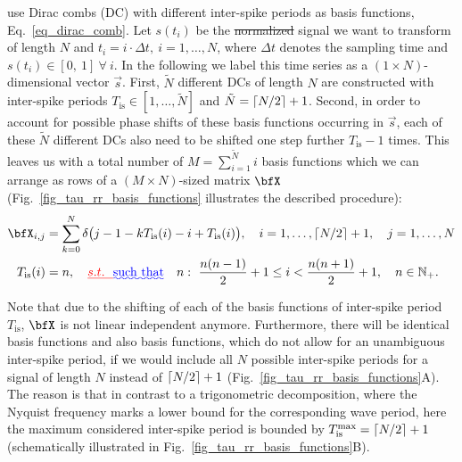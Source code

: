 \documentclass[entropy,article,submit,pdftex,moreauthors]{Definitions/mdpi}
\DeclarePairedDelimiter\ceil{\lceil}{\rceil}
\providecommand{\DIFadd}[1]{{\protect\color{blue}\uwave{#1}}} %
\providecommand{\DIFdel}[1]{{\protect\color{red}\sout{#1}}}                      %
\providecommand{\DIFaddbegin}{} %
\providecommand{\DIFaddend}{} %
\providecommand{\DIFdelbegin}{} %
\providecommand{\DIFdelend}{} %
\begin{document}
\DIFadd{Here we propose to }\DIFaddend use Dirac combs (DC) with 
different inter-spike periods as basis functions, Eq.~\eqref{eq_dirac_comb}. Let $s(t_i)$ be the \DIFdelbegin \DIFdel{normalized }\DIFdelend \DIFaddbegin \DIFadd{min-max-normalized }\DIFaddend signal we want to transform of length $N$ and 
$t_i=i\cdot \Delta t,~i=1,\ldots,N$, where $\Delta t$ denotes the sampling time and $s(t_i) \in [0,\ 1]\ \forall\ i$. In the following we label this time series as a $(1\times N)$-dimensional 
vector $\vec{s}$. 
First, $\tilde{N}$ different DCs of length $N$ are constructed with inter-spike periods $T_\text{is} \in [1,\ldots,\tilde{N}]$ and $\tilde{N}=\ceil*{N/2}+1$. Second, in order to account 
for possible phase shifts of 
these basis functions occurring in $\vec{s}$, each of these $\tilde{N}$ different DCs also need to be shifted one step further $T_\text{is}-1$ times. This leaves us with a total number of 
$M = \sum_{i=1}^{\tilde{N}}i$ 
basis functions which we can arrange as rows of a $(M\times N)$-sized matrix $\bfX$
(Fig.~\ref{fig_tau_rr_basis_functions} illustrates the described procedure):
\begin{align}
\label{eq_basis_matrix} 
\bfX_{i,j} &= \sum_{k=0}^{N}\delta\bigl(j-1-kT_\text{is}(i)-i+T_\text{is}(i) \bigr), \quad i=1,\dots,\ceil*{N/2}+1, \quad j=1,\dots,N\\
\label{eq_T_is} T_\text{is}(i)&= n, \quad \DIFdelbegin \DIFdel{s.t.~~ }\DIFdelend \DIFaddbegin \DIFadd{\text{such that}}\quad \DIFaddend n:~ \frac{n(n-1)}{2} + 1 \leq i <  \frac{n(n+1)}{2} + 1,\quad n \in \mathbb{N}_+.
\end{align}

Note that due to the shifting of each of the basis functions of inter-spike period $T_\text{is}$, $\bfX$ is not linear independent anymore. 
Furthermore, there will be identical basis functions and also basis functions, which do not allow for an unambiguous inter-spike period, 
if we would include all $N$ possible inter-spike periods for a signal of length $N$ instead of $\ceil*{N/2}+1$ (Fig.~\ref{fig_tau_rr_basis_functions}A).
The reason is that in contrast to a trigonometric decomposition, where the Nyquist frequency marks a lower bound for the corresponding wave period, here 
the maximum considered inter-spike period is bounded by $T_{\text{is}}^{\text{max}} = \ceil*{N/2}+1$ (schematically illustrated in 
Fig.~\ref{fig_tau_rr_basis_functions}B). 
\DIFdelbegin %
\DIFdelend 
\end{document}

